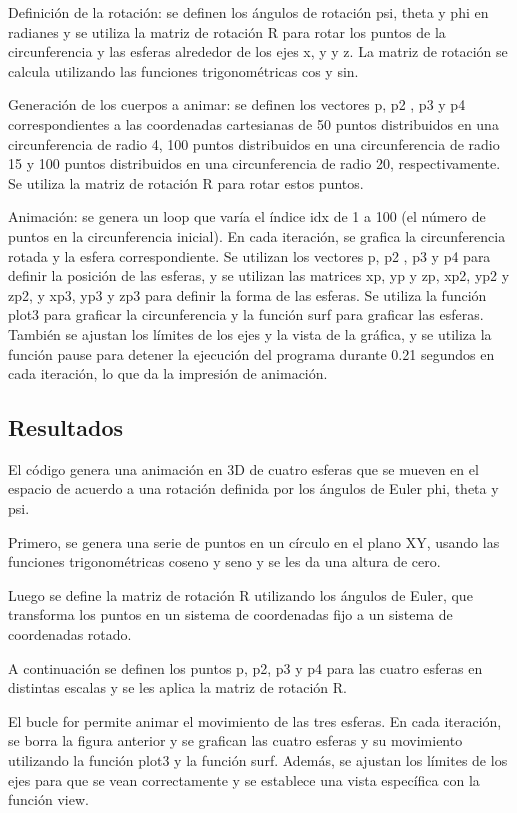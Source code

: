 \documentclass[12pt]{article}
\begin{document}
	Definición de la rotación: se definen los ángulos de rotación psi, theta y phi en radianes y se utiliza la matriz de rotación R para rotar los puntos de la circunferencia y las esferas alrededor de los ejes x, y y z. La matriz de rotación se calcula utilizando las funciones trigonométricas cos y sin.
	
	Generación de los cuerpos a animar: se definen los vectores p, p2 , p3 y p4 correspondientes a las coordenadas cartesianas de 50 puntos distribuidos en una circunferencia de radio 4, 100 puntos distribuidos en una circunferencia de radio 15 y 100 puntos distribuidos en una circunferencia de radio 20, respectivamente. Se utiliza la matriz de rotación R para rotar estos puntos.
	
	Animación: se genera un loop que varía el índice idx de 1 a 100 (el número de puntos en la circunferencia inicial). En cada iteración, se grafica la circunferencia rotada y la esfera correspondiente. Se utilizan los vectores p, p2 , p3 y p4 para definir la posición de las esferas, y se utilizan las matrices xp, yp y zp, xp2, yp2 y zp2, y xp3, yp3 y zp3 para definir la forma de las esferas. Se utiliza la función plot3 para graficar la circunferencia y la función surf para graficar las esferas. También se ajustan los límites de los ejes y la vista de la gráfica, y se utiliza la función pause para detener la ejecución del programa durante 0.21 segundos en cada iteración, lo que da la impresión de animación.
	
	\subsection{Resultados}
	El código genera una animación en 3D de cuatro esferas que se mueven en el espacio de acuerdo a una rotación definida por los ángulos de Euler phi, theta y psi.
	
	Primero, se genera una serie de puntos en un círculo en el plano XY, usando las funciones trigonométricas coseno y seno y se les da una altura de cero.
	
	Luego se define la matriz de rotación R utilizando los ángulos de Euler, que transforma los puntos en un sistema de coordenadas fijo a un sistema de coordenadas rotado.
	
	A continuación se definen los puntos p, p2, p3 y p4 para las cuatro esferas en distintas escalas y se les aplica la matriz de rotación R.
	
	El bucle for permite animar el movimiento de las tres esferas. En cada iteración, se borra la figura anterior y se grafican las cuatro esferas y su movimiento utilizando la función plot3 y la función surf. Además, se ajustan los límites de los ejes para que se vean correctamente y se establece una vista específica con la función view.
	
\end{document}
